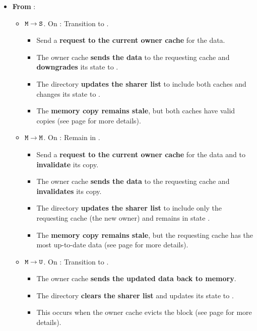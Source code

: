 \begin{itemize}
    \item \textbf{From }:
    \begin{itemize}
        \item $\texttt{M} \to \texttt{S}$. On : Transition to .
        \begin{itemize}
            \item Send a \textbf{request to the current owner cache} for the data.
            \item The owner cache \textbf{sends the data} to the requesting cache and \textbf{downgrades} its state to .
            \item The directory \textbf{updates the sharer list} to include both caches and changes its state to .
            \item The \textbf{memory copy remains stale}, but both caches have valid copies (see page  for more details).
        \end{itemize}
        \item $\texttt{M} \to \texttt{M}$. On : Remain in .
        \begin{itemize}
            \item Send a \textbf{request to the current owner cache} for the data and to \textbf{invalidate} its copy.
            \item The owner cache \textbf{sends the data} to the requesting cache and \textbf{invalidates} its copy.
            \item The directory \textbf{updates the sharer list} to include only the requesting cache (the new owner) and remains in state .
            \item The \textbf{memory copy remains stale}, but the requesting cache has the most up-to-date data (see page  for more details).
        \end{itemize}
        \item $\texttt{M} \to \texttt{U}$. On : Transition to .
        \begin{itemize}
            \item The owner cache \textbf{sends the updated data back to memory}.
            \item The directory \textbf{clears the sharer list} and updates its state to .
            \item This occurs when the owner cache evicts the block (see page  for more details).
        \end{itemize}
    \end{itemize}
\end{itemize}

